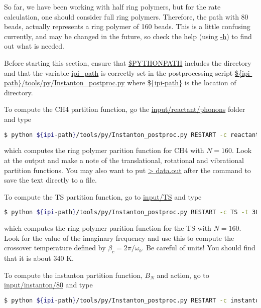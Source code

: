 \documentclass{article}
\begin{document}
\begin{Exercise}[label={post},title={Postprocessing for the rate calculation}]

So far, we have been working with half ring polymers, but for the rate calculation, one should consider full ring polymers.
Therefore, the path with 80 beads, actually represents a ring polymer of 160 beads.
This is a little confusing currently, and may be changed in the future, so check the help (using \url{-h}) to find out what is needed.

Before starting this section, ensure that \url{\$PYTHONPATH} includes the \ipi{} directory
and that the variable \url{ipi\_path} is correctly set in the postprocessing script \url{\$\{ipi-path\}/tools/py/Instanton\_postproc.py} where \url{\$\{ipi-path\}} is the location of \ipi{} directory.

\Question
To compute the CH4 partition function, go the \url{input/reactant/phonons} folder and type
\begin{lstlisting}[language=bash]
$ python ${ipi-path}/tools/py/Instanton_postproc.py RESTART -c reactant -t 300 -n 160 -f 5
\end{lstlisting}
which computes the ring polymer parition function for CH4 with $N=160$.
Look at the output and make a note of the translational, rotational and vibrational partition functions.
You may also want to put \url{> data.out} after the command to save the text directly to a file.

\Question
To compute the TS partition function, go to \url{input/TS} and type
\begin{lstlisting}[language=bash]
$ python ${ipi-path}/tools/py/Instanton_postproc.py RESTART -c TS -t 300 -n 160
\end{lstlisting}
which computes the ring polymer parition function for the TS with $N=160$.
Look for the value of the imaginary frequency and use this to compute the crossover temperature defined by $\beta_c = 2\pi/\omega_b$.  Be careful of units!  You should find that it is about 340 K.

\Question
To compute the instanton partition function, $B_N$ and action,
go to \url{input/instanton/80} and type
\begin{lstlisting}[language=bash]
$ python ${ipi-path}/tools/py/Instanton_postproc.py RESTART -c instanton -t 300
\end{lstlisting}


\end{Exercise}
\end{document}
